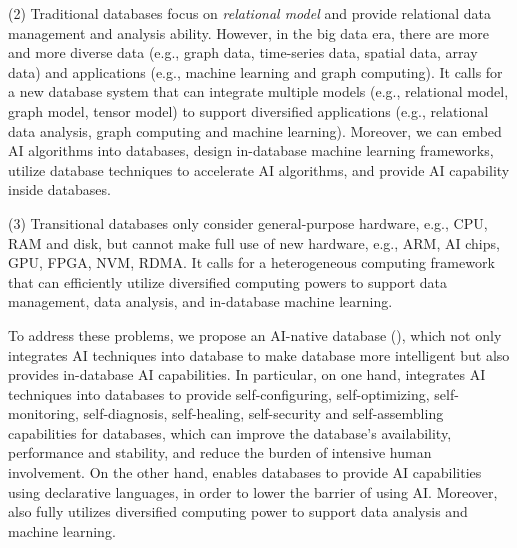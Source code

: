 

(2) Traditional databases focus on {\it relational model} and provide relational data management and analysis ability. However, in the big data era, there are more and more diverse data (e.g., graph data, time-series data, spatial data, array data) and applications (e.g., machine learning and graph computing). It calls for a new database system that can integrate multiple models (e.g., relational model, graph model, tensor model) to support diversified applications (e.g., relational data analysis, graph computing and machine learning). Moreover, we can embed AI algorithms into databases, design in-database machine learning frameworks, utilize database techniques to accelerate AI algorithms, and provide AI capability inside databases.


(3) Transitional databases only consider general-purpose hardware, e.g., CPU, RAM and disk, but cannot make full use of new hardware, e.g., ARM, AI chips, GPU, FPGA, NVM, RDMA. It calls for a heterogeneous computing framework that can efficiently utilize diversified computing powers to support data management, data analysis, and in-database machine learning. 



To address these problems, we propose an AI-native database (\oursys), which not only integrates AI techniques into database to make database more intelligent but also provides in-database AI capabilities. In particular, on one hand, \oursys integrates AI techniques into databases to provide self-configuring, self-optimizing, self-monitoring, self-diagnosis, self-healing, self-security and self-assembling capabilities for databases, which can improve the database's availability, performance and stability, and reduce the burden of intensive human involvement. On the other hand, \oursys enables databases to provide AI capabilities using declarative languages, in order to lower the barrier of using AI. Moreover, \oursys also fully utilizes diversified computing power to support data analysis and machine learning. 

